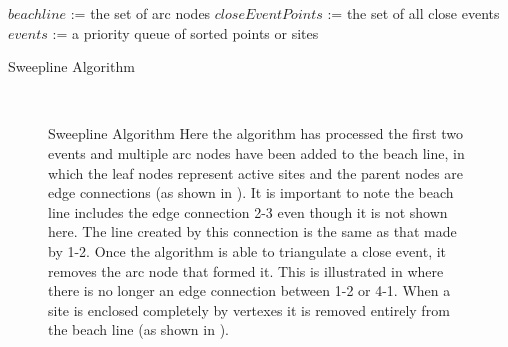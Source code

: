 \documentclass{egpubl}
\begin{document}
\algorithmspace
\begin{algorithm}
  \DontPrintSemicolon
  \BlankLine
  $beachline$ := the set of arc nodes\;
  $closeEventPoints$ := the set of all close events\;
  $events$ := a priority queue of sorted points or sites\;
\caption{Sweepline Algorithm}
\label{alg:sweepline-algorithm}
\end{algorithm}
\algorithmspace

\begin{figure}
  \centering
   \\
  \caption{Sweepline Algorithm
    \protect{} Here the algorithm has processed the first two events and multiple arc nodes have been added to the beach line, in which the leaf nodes represent active sites and the parent nodes are edge connections (as shown in \protect{}). It is important to note the beach line includes the edge connection 2-3 even though it is not shown here. The line created by this connection is the same as that made by 1-2.
    \protect{} Once the algorithm is able to triangulate a close event, it removes the arc node that formed it. This is illustrated in \protect{} where there is no longer an edge connection between 1-2 or 4-1.
    \protect{} When a site is enclosed completely by vertexes it is removed entirely from the beach line (as shown in \protect{}).
  }
  \label{fig:sweepline}
\end{figure}
\end{document}
